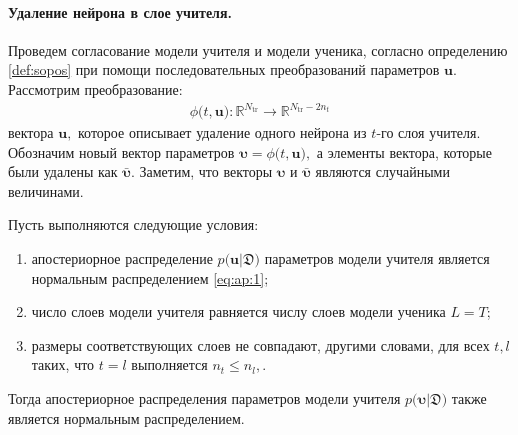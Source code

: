 \paragraph{Удаление нейрона в слое учителя.}
Проведем согласование модели учителя и модели ученика, согласно определению \ref{def:sopos} при помощи последовательных преобразований параметров $\mathbf{u}$. Рассмотрим преобразование:
\[
\label{eq:ap:2}
\begin{aligned}
\phi\bigr(t, \mathbf{u}\bigr) : \mathbb{R}^{N_{\text{tr}}} \to \mathbb{R}^{N_{\text{tr}}-2n_t}
\end{aligned}
\]
вектора $\mathbf{u},$ которое описывает удаление одного нейрона из $t$-го слоя учителя.
Обозначим новый вектор параметров $\bm{\upsilon} =  \phi\bigr(t, \mathbf{u}\bigr),$ а элементы вектора, которые были удалены как $\bar{\bm{\upsilon}}.$ Заметим, что векторы $\bm{\upsilon}$ и $\bar{\bm{\upsilon}}$ являются случайными величинами. 
\begin{theorem}
\label{theorem:ap:neural}
Пусть выполняются следующие условия:
\begin{enumerate}
\item апостериорное распределение $p\bigr(\mathbf{u}|\mathfrak{D}\bigr)$ параметров модели учителя является нормальным распределением \eqref{eq:ap:1};
\item число слоев модели учителя равняется числу слоев модели ученика $L=T$;
\item размеры соответствующих слоев не совпадают, другими словами, для всех $t, l$ таких, что $t=l$ выполняется $n_t \leq n_l,$.
\end{enumerate}
Тогда апостериорное распределения параметров модели учителя $p\bigr(\bm{\upsilon}|\mathfrak{D}\bigr)$ также является нормальным распределением.
\end{theorem}
